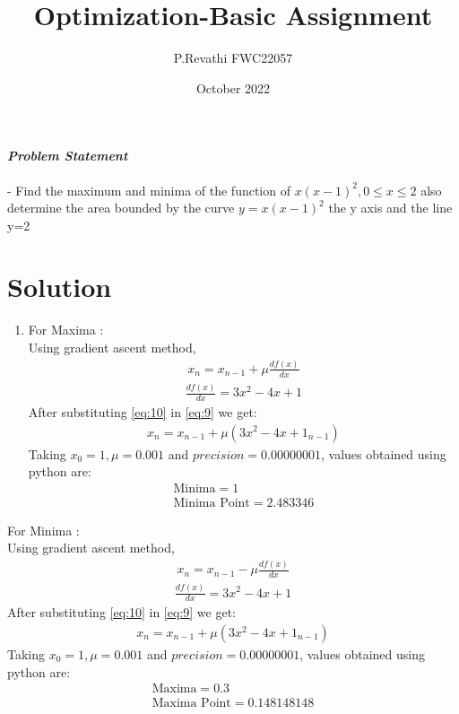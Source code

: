 \documentclass[journal,10pt,twocolumn]{article}
\title{\textbf{Optimization-Basic Assignment}}
\author{P.Revathi \hspace{9cm} FWC22057}
\date{October 2022}
\begin{document}
\maketitle
\paragraph{\textit{Problem Statement}} - Find the maximum and minima of the function of $x(x-1)^2,0\leq x\leq 2$ also determine the area bounded by the curve $y=x(x-1)^2$ the y axis and the line y=2

\section*{\large Solution}

\begin{enumerate}
\item For Maxima : \\
    Using gradient ascent method,
\begin{align}
    x_n=x_{n-1}+\mu\frac{df(x)}{dx} \label{eq:9}
    \end{align}
    \begin{align}
    \frac{df(x)}{dx}=3x^2-4x+1 \label{eq:10}
\end{align}
After substituting \ref{eq:10} in \ref{eq:9} we get:
\begin{align}
    x_n=x_{n-1}+\mu(3x^2-4x+1_{n-1})\label{eq:11}
\end{align}
Taking $x_0 = 1, \mu = 0.001$ and $precision = 0.00000001$, values obtained using python are:
\begin{align}
\boxed{\text{Minima} = 1} \\
\boxed{\text{Minima Point} = 2.483346}
\end{align}
\end{enumerate}
 For Minima : \\
    Using gradient ascent method,
\begin{align}
    x_n=x_{n-1}-\mu\frac{df(x)}{dx} \label{eq:9}
    \end{align}
    \begin{align}
    \frac{df(x)}{dx}=3x^2-4x+1 \label{eq:10}
\end{align}
After substituting \ref{eq:10} in \ref{eq:9} we get:
\begin{align}
    x_n=x_{n-1}+\mu(3x^2-4x+1_{n-1})\label{eq:11}
\end{align}
Taking $x_0 = 1, \mu = 0.001$ and $precision = 0.00000001$, values obtained using python are:
\begin{align}
\boxed{\text{Maxima} = 0.3 } \\
\boxed{\text{Maxima Point} = 0.148148148 }
\end{align}
\end{document}
